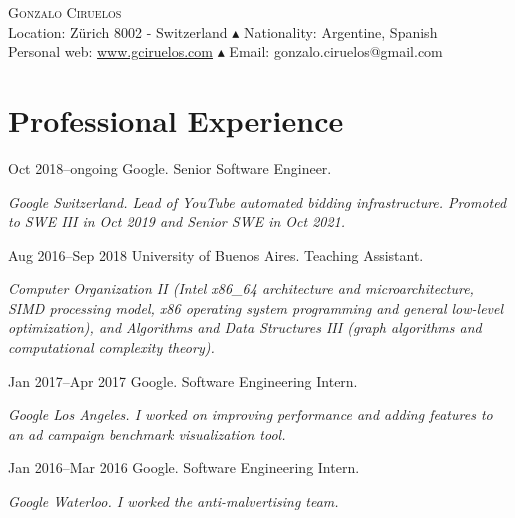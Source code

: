 \documentclass[a4paper,english,10pt]{article}
\begin{document}
\pagestyle{empty}

\begin{center}

  \Large{\textsc{Gonzalo Ciruelos}}\\
  \vspace{0.3em}
\footnotesize{
  Location: Z\"urich 8002 - Switzerland $\blacktriangle$ Nationality: Argentine, Spanish \\
  Personal web: \href{http://www.gciruelos.com}{www.gciruelos.com} $\blacktriangle$ Email: gonzalo.ciruelos@gmail.com
}
\end{center}


\section{Professional Experience}
\begin{CV}
\item[Oct 2018--ongoing] Google. Senior Software Engineer.\newline
  \begin{footnotesize}
  \emph{Google Switzerland. Lead of YouTube automated bidding infrastructure. Promoted to SWE III in Oct 2019 and Senior SWE in Oct 2021.}
  \end{footnotesize}
\item[Aug 2016--Sep 2018] University of Buenos Aires. Teaching Assistant.\newline
  \begin{footnotesize}
  \emph{Computer Organization II (Intel x86\_64 architecture and microarchitecture, SIMD processing model, x86 operating system programming and general low-level optimization), and Algorithms and Data Structures III (graph algorithms and computational complexity theory).}
  \end{footnotesize}
\item[Jan 2017--Apr 2017] Google. Software Engineering Intern.\newline
  \begin{footnotesize}
  \emph{Google Los Angeles. I worked on improving performance and adding features to an ad campaign benchmark visualization tool.}
  \end{footnotesize}
\item[Jan 2016--Mar 2016] Google. Software Engineering Intern.\newline
  \begin{footnotesize}
  \emph{Google Waterloo. I worked the anti-malvertising team.}
  \end{footnotesize}
\end{CV}
\end{document}
